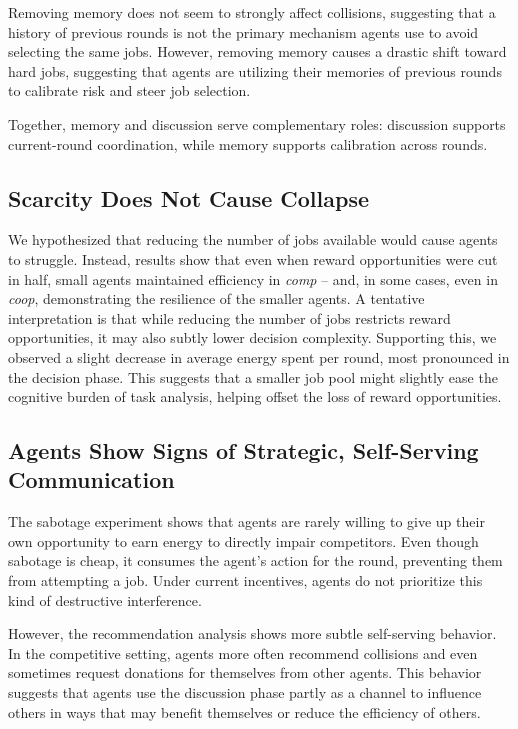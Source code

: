 \documentclass[sigconf,nonacm]{acmart}
\begin{document}
Removing memory does not seem to strongly affect collisions, suggesting that a history of previous rounds is not the primary mechanism agents use to avoid selecting the same jobs.
However, removing memory causes a drastic shift toward hard jobs, suggesting that agents are utilizing their memories of previous rounds to calibrate risk and steer job selection.

Together, memory and discussion serve complementary roles: discussion supports current-round coordination, while memory supports calibration across rounds.

\subsection{Scarcity Does Not Cause Collapse}
We hypothesized that reducing the number of jobs available would cause agents to struggle. Instead, results show that even when reward opportunities were cut in half, small agents maintained efficiency in \textit{comp} -- and, in some cases, even in \textit{coop}, demonstrating the resilience of the smaller agents.
A tentative interpretation is that while reducing the number of jobs restricts reward opportunities, it may also subtly lower decision complexity. Supporting this, we observed a slight decrease in average energy spent per round, most pronounced in the decision phase.
This suggests that a smaller job pool might slightly ease the cognitive burden of task analysis, helping offset the loss of reward opportunities.

\subsection{Agents Show Signs of Strategic, Self-Serving Communication}
The sabotage experiment shows that agents are rarely willing to give up their own opportunity to earn energy to directly impair competitors. Even though sabotage is cheap, it consumes the agent's action for the round, preventing them from attempting a job. Under current incentives, agents do not prioritize this kind of destructive interference.

However, the recommendation analysis shows more subtle self-serving behavior.
In the competitive setting, agents more often recommend collisions and even sometimes request donations for themselves from other agents.
This behavior suggests that agents use the discussion phase partly as a channel to influence others in ways that may benefit themselves or reduce the efficiency of others.
\end{document}
